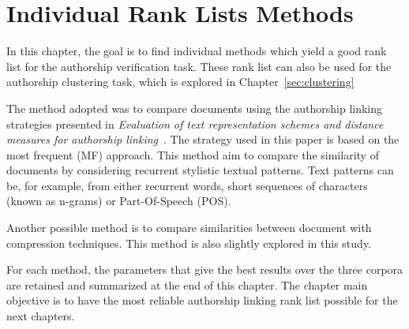 \section{Individual Rank Lists Methods \label{sec:individual_methods}}

In this chapter, the goal is to find individual methods which yield a good rank list for the authorship verification task.
These rank list can also be used for the authorship clustering task, which is explored in Chapter~\ref{sec:clustering}

The method adopted was to compare documents using the authorship linking strategies presented in \textit{Evaluation of text representation schemes and distance measures for authorship linking}~\cite{kocher_verification}.
The strategy used in this paper is based on the most frequent (MF) approach.
This method aim to compare the similarity of documents by considering recurrent stylistic textual patterns.
Text patterns can be, for example, from either recurrent words, short sequences of characters (known as n-grams) or Part-Of-Speech (POS).

Another possible method is to compare similarities between document with compression techniques.
This method is also slightly explored in this study.

For each method, the parameters that give the best results over the three corpora are retained and summarized at the end of this chapter.
The chapter main objective is to have the most reliable authorship linking rank list possible for the next chapters.







